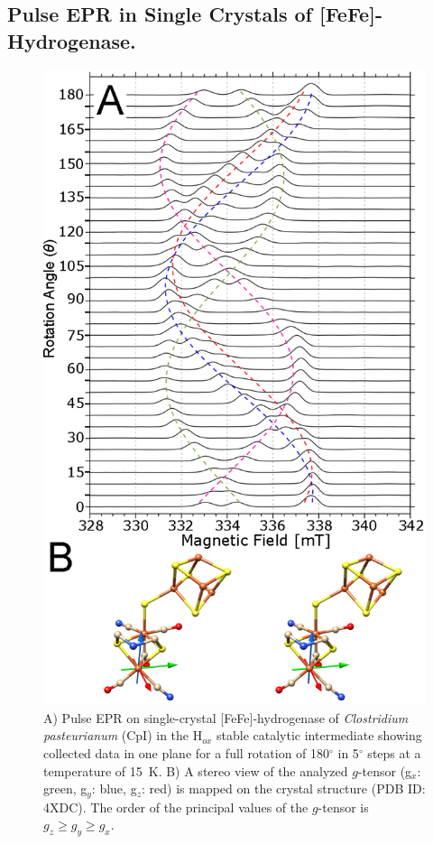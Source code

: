 \subsection{Pulse EPR in Single Crystals of [FeFe]-Hydrogenase.}
\begin{figure}[htbp]
\centering
 \includegraphics{Kapitel/Ch5-Images/04-FeFe-xTal-DataBig.eps}
 \caption[Pulse EPR on single-crystal of the H-cluster in FeFe-hydrogenase.]{A) Pulse EPR on single-crystal [FeFe]-hydrogenase of \textit{Clostridium pasteurianum} (CpI) in the H$_{ox}$ stable catalytic intermediate showing collected data in one plane for a full rotation of 180$^{\circ}$ in 5$^{\circ}$ steps at a temperature of 15~K. B) A stereo view of the analyzed $g$-tensor (g$_x$: green, g$_y$: blue, g$_z$: red) is mapped on the crystal structure (PDB ID: 4XDC). The order of the principal values of the $g$-tensor is $g_z\geq g_y\geq g_x$.} 
 \label{fig:xTalFeFe}
\end{figure}

